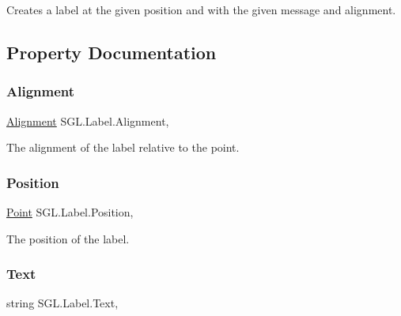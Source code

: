 Creates a label at the given position and with the given message and alignment. 



\subsection{Property Documentation}
\mbox{\label{class_s_g_l_1_1_label_a00910f48f4a61d787308b77341ba9bcc}} 
\subsubsection{\texorpdfstring{Alignment}{Alignment}}
{\footnotesize\ttfamily \mbox{\hyperlink{namespace_s_g_l_aa8de446c655c151ef21cfe27b24da87c}{Alignment}} S\+G\+L.\+Label.\+Alignment\hspace{0.3cm}{\ttfamily [get]}, {\ttfamily [set]}}



The alignment of the label relative to the point. 

\mbox{\label{class_s_g_l_1_1_label_a31dbcad567e6ef89d49f02eb55312308}} 
\subsubsection{\texorpdfstring{Position}{Position}}
{\footnotesize\ttfamily \mbox{\hyperlink{struct_s_g_l_1_1_point}{Point}} S\+G\+L.\+Label.\+Position\hspace{0.3cm}{\ttfamily [get]}, {\ttfamily [set]}}



The position of the label. 

\mbox{\label{class_s_g_l_1_1_label_abc39b1a43ac82e057d716f3d2bc6056a}} 
\subsubsection{\texorpdfstring{Text}{Text}}
{\footnotesize\ttfamily string S\+G\+L.\+Label.\+Text\hspace{0.3cm}{\ttfamily [get]}, {\ttfamily [set]}}



